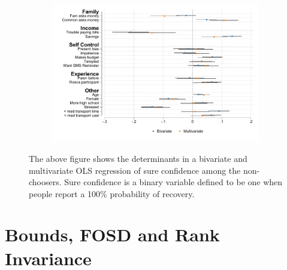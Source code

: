 \begin{figure}[H]
    \caption{Determinants sure confidence}
    \label{determinants_sure}
    \begin{center}
    \begin{subfigure}{0.6\textwidth}
        \centering
        \includegraphics[width=\textwidth]{Figuras/determinants_confidence_100.pdf}
    \end{subfigure}
    \end{center}
      \scriptsize

      The above figure shows the determinants in a bivariate and multivariate OLS regression of sure confidence among the non-choosers. Sure confidence is a binary variable defined to be one when people report a 100\% probability of recovery.
\end{figure}




\section{Bounds, FOSD and Rank Invariance} \label{bounds_FOSD}

